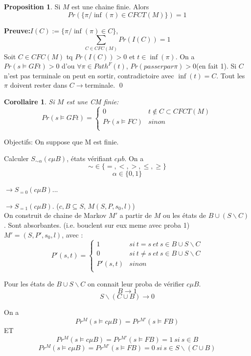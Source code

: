 \documentclass[12pt]{article}
\theoremstyle{plain}
\newtheorem{cor}[subsubsection]{Corollaire}
\theoremstyle{definition}
\newtheorem{prop}[subsubsection]{Proposition}
\theoremstyle{remark}
\begin{document}
\begin{prop}
    Si $M$ est une chaine finie. Alors 
    \[Pr(\{\pi/\inf(\pi)\in CFCT(M)\})=1\]
\end{prop}
\textbf{Preuve:}$I(C):=\{\pi/\inf(\pi)\in C\}$, 
\[\sum_{C\in CFC(M)}Pr(I(C))=1\]
Soit $C\in CFC(M)$ tq $Pr(I(C))>0$ et $t\in \inf(\pi)$.
On a $Pr(s\vDash GFt)>0$ d'ou $\forall\pi\in Path^F(t)$,
$Pr(passer par \pi)>0$(en fait 1). Si $C$ n'est pas terminale
on peut en sortir, contradictoire avec $\inf(t)=C$.
Tout les $\pi$ doivent rester dans $C\to$terminale. \qed\\
\begin{cor}
    Si $M$ est une CM finie:
    \[Pr(s\vDash GFt)=
    \begin{cases}
        0& t\notin C\subset CFCT(M)\\
        Pr(s\vDash FC)& sinon\\
    \end{cases}\]
\end{cor}

Objectifs: On suppose que M est finie.

Calculer $S_{\sim\alpha}(c\mu B)$, états vérifiant $c\mu b$. On
a \[
    \sim\in\{=,<,>,\leq,\geq\}
\]
\[
    \alpha\in\{0,1\}
\]

$\to$$S_{=0}(c\mu B)$...

$\to S_{=1}(c\mu B)$. ($c,B\subseteq S$, $M(S,P,s_0, l)$)\\

On construit de chaine de Markov $M'$ a partir de $M$ ou
les états de $B\cup(S\backslash C)$. Sont absorbantes. (i.e.
bouclent sur eux meme avec proba 1)\\
$M'=(S,P', s_0, l)$, avec :
\[
    P'(s,t)=\begin{cases}
        1& si~t=s~et~s\in B\cup S\backslash C\\
        0& si~t\ne s~et~s\in B\cup S\backslash C\\
        P'(s,t)& sinon\\
    \end{cases}
\]

Pour les états de $B\cup S\backslash C$ on connait 
leur proba de vérifier $c\mu B$. \[B\to 1\]
\[S\backslash (C\cup B)\to 0\]

On a \[Pr^M(s\vDash c\mu B)=Pr^{M'}(s\vDash FB)\]
ET \[Pr^M(s\vDash c\mu B)=Pr^{M'}(s\vDash FB)=1~si~s\in B\]
\[Pr^M(s\vDash c\mu B)=Pr^{M'}(s\vDash FB)=0~si~s\in S
\backslash(C\cup B)\]
\end{document}
